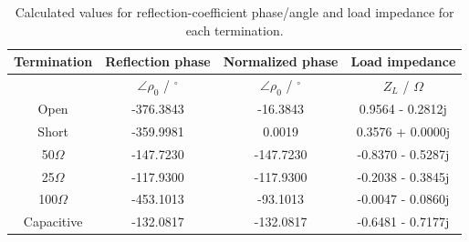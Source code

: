 \begin{table}[ht!]
	\centering
	\begin{tabular}{|c|c|c|c|}
		\hline
		\textbf{Termination} & \textbf{Reflection phase} & \textbf{Normalized phase} & \textbf{Load impedance} \\
		\hline
		& $\angle\rho_0$ / $^\circ$ & $\angle\rho_0$ / $^\circ$ & $Z_L$ / $\Omega$ \\
		\hline\hline
		Open        & -376.3843 & -16.3843 	& 	0.9564 - 0.2812j 	\\
		Short       & -359.9981 & 0.0019 	&  	0.3576 + 0.0000j 	\\
		50$\Omega$  & -147.7230 & -147.7230 &	-0.8370 - 0.5287j 	\\
		25$\Omega$  & -117.9300 & -117.9300 &   -0.2038 - 0.3845j 	\\
		100$\Omega$ & -453.1013 & -93.1013  &   -0.0047 - 0.0860j	\\
		Capacitive  & -132.0817 & -132.0817 &   -0.6481 - 0.7177j	\\
		\hline
	\end{tabular}
	\caption{\centering Calculated values for reflection-coefficient phase/angle and load impedance for each termination.}
	\label{tab:refl_phase_n_load}
\end{table}
